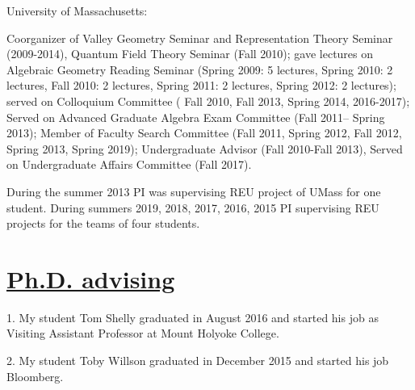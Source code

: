 \documentclass[11pt]{amsart}
\theoremstyle{plain}
\theoremstyle{definition}
\theoremstyle{remark}
\begin{document}
\medskip

\noindent University of Massachusetts:

\noindent Coorganizer of Valley Geometry Seminar and Representation Theory Seminar (2009-2014), Quantum Field Theory Seminar (Fall 2010);
gave   lectures on Algebraic Geometry Reading Seminar (Spring 2009: 5 lectures, Spring 2010: 2 lectures, Fall 2010: 2 lectures, Spring 2011: 2 lectures, Spring 2012: 2 lectures); 
served on Colloquium Committee ( Fall 2010, Fall 2013, Spring 2014, 2016-2017); 
Served on Advanced Graduate Algebra Exam Committee (Fall 2011-- Spring 2013); Member of Faculty Search Committee 
(Fall 2011, Spring 2012, Fall 2012, Spring 2013, Spring 2019); 
Undergraduate Advisor (Fall 2010-Fall 2013), Served on Undergraduate Affairs Committee (Fall 2017).


\medskip

\noindent During the summer 2013 PI was supervising REU project of
UMass for one student. During summers 2019, 2018, 2017, 2016, 2015 PI supervising
REU projects for the teams of four students. 


\section*{\Large \underline{Ph.D. advising}}

\medskip

1. My student Tom Shelly graduated in August 2016 and started his job as Visiting Assistant Professor at Mount Holyoke College. 

2. My student Toby Willson graduated in December 2015 and started his job Bloomberg. 



\end{document}
